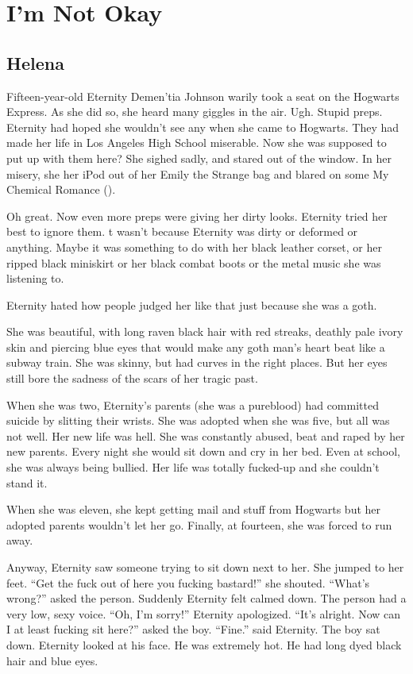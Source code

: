 \chapter{I'm Not Okay}

\section{Helena}

Fifteen-year-old Eternity Demen'tia Johnson warily took a seat on the Hogwarts Express. As she did so, she heard many giggles in the air. Ugh. Stupid preps. Eternity had hoped she wouldn't see any when she came to Hogwarts. They had made her life in Los Angeles High School miserable. Now she was supposed to put up with them here? She sighed sadly, and stared out of the window. In her misery, she her iPod out of her Emily the Strange bag and blared on some My Chemical Romance ().

Oh great. Now even more preps were giving her dirty looks. Eternity tried her best to ignore them. t wasn't because Eternity was dirty or deformed or anything. Maybe it was something to do with her black leather corset, or her ripped black miniskirt or her black combat boots or the metal music she was listening to.

Eternity hated how people judged her like that just because she was a goth.

She was beautiful, with long raven black hair with red streaks, deathly pale ivory skin and piercing blue eyes that would make any goth man's heart beat like a subway train. She was skinny, but had curves in the right places. But her eyes still bore the sadness of the scars of her tragic past.

When she was two, Eternity's parents (she was a pureblood) had committed suicide by slitting their wrists. She was adopted when she was five, but all was not well. Her new life was hell. She was constantly abused, beat and raped by her new parents. Every night she would sit down and cry in her bed. Even at school, she was always being bullied. Her life was totally fucked-up and she couldn't stand it.

When she was eleven, she kept getting mail and stuff from Hogwarts but her adopted parents wouldn't let her go. Finally, at fourteen, she was forced to run away.

Anyway, Eternity saw someone trying to sit down next to her. She jumped to her feet. \enquote{Get the fuck out of here you fucking bastard!} she shouted. \enquote{What's wrong?} asked the person. Suddenly Eternity felt calmed down. The person had a very low, sexy voice. \enquote{Oh, I'm sorry!} Eternity apologized. \enquote{It's alright. Now can I at least fucking sit here?} asked the boy. \enquote{Fine.} said Eternity. The boy sat down. Eternity looked at his face. He was extremely hot. He had long dyed black hair and blue eyes.


